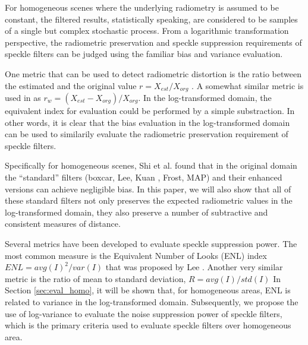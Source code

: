 \documentclass[journal]{IEEEtran}
\begin{document}
For homogeneous scenes where the underlying radiometry is assumed to be constant, 
	the filtered results, statistically speaking, are considered to be samples of 
	a single but complex stochastic process.
From a logarithmic transformation perspective, the radiometric preservation and speckle suppression requirements 
	of speckle filters can be judged using the familiar bias and variance evaluation.

One metric that can be used to detect radiometric distortion is the ratio between the estimated and the 
	original value $r = X_{est} / X_{org}$ \cite{Oliver_2004_SciTech} \cite{Medeiros_2003_IJRS}.
A somewhat similar metric is used in \cite{Wang_2005_MIPR} as $r_w = (X_{est} - X_{org} )/ X_{org}$.
In the log-transformed domain, the equivalent index for evaluation could be performed by a simple substraction.
In other words, it is clear that the bias evaluation in the log-transformed domain 
	can be used to similarily evaluate the radiometric preservation requirement of speckle filters. 

Specifically for homogeneous scenes, Shi et al. \cite{Shi_IGARSS_1994} found that 
	in the original domain the ``standard'' filters (boxcar, Lee\cite{Lee_PAMI_1980}, 
	Kuan \cite{Kuan_1985_PAMI}, Frost\cite{Frost_PAMI_1982}, 
	MAP\cite{Lopes_IGARSS_1990}) and their enhanced versions \cite{Lopes_TGRS_1990} can achieve negligible bias. 
In this paper, we will also show that all of these standard filters 
	not only preserves the expected radiometric values in the log-transformed domain,
	they also preserve a number of subtractive and consistent measures of distance.

Several metrics have been developed to evaluate speckle suppression power.
The most common measure is the Equivalent Number of Looks (ENL) index 
$ENL=avg(I)^2/var(I)$
that was proposed by Lee \cite{Lee_1981_CGIP}.
Another very similar metric is the ratio of mean to standard deviation, $R=avg(I)/std(I)$ \cite{Gagnon_SPIEProc_1997} 
In Section \ref{sec:eval_homo}, it will be shown that, for homogeneous areas, ENL is related to variance in the 
	log-transformed domain.
Subsequently, we propose the use of log-variance to evaluate the noise suppression power of speckle filters, 
	which is the primary criteria used to evaluate speckle filters over homogeneous area.
\end{document}
